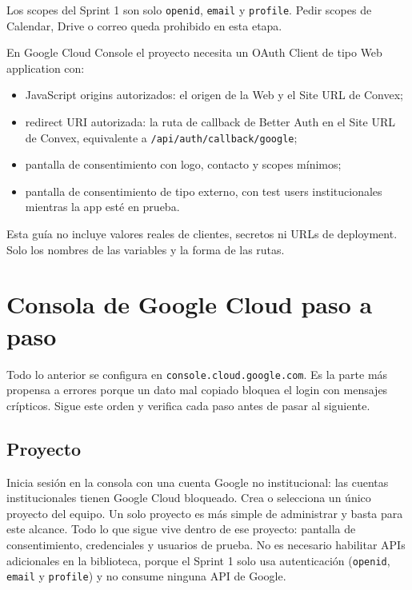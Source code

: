 \documentclass[11pt,a4paper]{article}
\begin{document}
Los scopes del Sprint 1 son solo \texttt{openid}, \texttt{email} y
\texttt{profile}. Pedir scopes de Calendar, Drive o correo queda prohibido en
esta etapa.

En Google Cloud Console el proyecto necesita un OAuth Client de tipo Web
application con:

\begin{itemize}
  \item JavaScript origins autorizados: el origen de la Web y el Site URL de
    Convex;
  \item redirect URI autorizada: la ruta de callback de Better Auth en el Site
    URL de Convex, equivalente a \texttt{/api/auth/callback/google};
  \item pantalla de consentimiento con logo, contacto y scopes mínimos;
  \item pantalla de consentimiento de tipo externo, con test users
    institucionales mientras la app esté en prueba.
\end{itemize}

Esta guía no incluye valores reales de clientes, secretos ni URLs de
deployment. Solo los nombres de las variables y la forma de las rutas.

\section{Consola de Google Cloud paso a paso}

Todo lo anterior se configura en \texttt{console.cloud.google.com}. Es la
parte más propensa a errores porque un dato mal copiado bloquea el login con
mensajes crípticos. Sigue este orden y verifica cada paso antes de pasar al
siguiente.

\subsection{Proyecto}

Inicia sesión en la consola con una cuenta Google no institucional: las
cuentas institucionales tienen Google Cloud bloqueado. Crea o selecciona un
único proyecto del equipo. Un solo proyecto es más simple de administrar y
basta para este alcance. Todo lo que sigue vive dentro de ese proyecto:
pantalla de consentimiento, credenciales y usuarios de prueba. No es
necesario habilitar APIs adicionales en la biblioteca, porque el Sprint 1
solo usa autenticación (\texttt{openid}, \texttt{email} y \texttt{profile})
y no consume ninguna API de Google.
\end{document}
